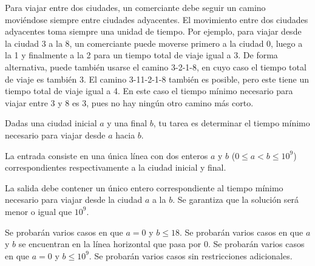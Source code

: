 \documentclass{oci}
\begin{document}
\begin{problemDescription}
Para viajar entre dos ciudades, un comerciante debe seguir un camino moviéndose
siempre entre ciudades adyacentes.
El movimiento entre dos ciudades adyacentes toma siempre una unidad de tiempo.
Por ejemplo, para viajar desde la ciudad 3 a la 8, un comerciante puede moverse primero
a la ciudad 0, luego a la 1 y finalmente a la 2 para un tiempo total de viaje igual a 3.
De forma alternativa, puede también usarse el camino 3-2-1-8, en cuyo caso el tiempo total de viaje
es también 3.
El camino 3-11-2-1-8 también es posible, pero este tiene un tiempo total de viaje igual a 4.
En este caso el tiempo mínimo necesario para viajar entre 3 y 8 es 3, pues no hay ningún otro camino
más corto.

Dadas una ciudad inicial $a$ y una final $b$, tu tarea es determinar el tiempo mínimo
necesario para viajar desde $a$ hacia $b$.
\end{problemDescription}

\begin{inputDescription}
  La entrada consiste en una única línea con dos enteros $a$ y $b$ ($0\leq a < b \leq 10^9$)
  correspondientes respectivamente a la ciudad inicial y final.
\end{inputDescription}

\begin{outputDescription}
  La salida debe contener un único entero correspondiente al tiempo mínimo necesario
  para viajar desde la ciudad $a$ a la $b$.
  Se garantiza que la solución será menor o igual que $10^9$.
\end{outputDescription}

\begin{scoreDescription}
  Se probarán varios casos en que $a = 0$ y $b \leq 18$.
  Se probarán varios casos en que $a$ y $b$ se encuentran en la
  línea horizontal que pasa por 0.
  Se probarán varios casos en que $a = 0$ y $b \leq 10^9$.
  Se probarán varios casos sin restricciones adicionales.
\end{scoreDescription}

\begin{sampleDescription}
\end{sampleDescription}
\end{document}
